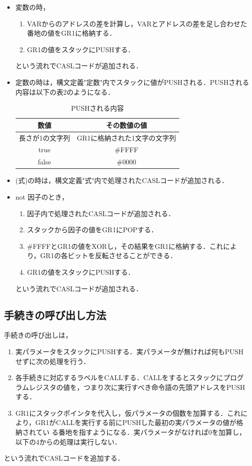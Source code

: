 \documentclass[dvipdfmx]{jarticle}
\begin{document}
  \begin{itemize}
    \item 変数の時，
    \begin{enumerate}
      \item VARからのアドレスの差を計算し，VARとアドレスの差を足し合わせた番地の値をGR1に格納する．
      \item GR1の値をスタックにPUSHする．
    \end{enumerate}
    という流れでCASLコードが追加される．
    \item 定数の時は，構文定義"定数"内でスタックに値がPUSHされる．PUSHされる内容は以下の表2のようになる．
    \begin{table}[h]
      \centering
      \begin{tabular}{|c||c|}
        \hline
        数値 & その数値の値\\\hline
        長さが1の文字列 & GR1に格納された1文字の文字列\\\hline
        true & \#FFFF\\\hline
        false & \#0000\\\hline
      \end{tabular}
      \caption{PUSHされる内容}
    \end{table}
    \item  (式)の時は，構文定義"式"内で処理されたCASLコードが追加される．
    \item not 因子のとき，
    \begin{enumerate}
      \item 因子内で処理されたCASLコードが追加される．
      \item スタックから因子の値をGR1にPOPする．
      \item \#FFFFとGR1の値をXORし，その結果をGR1に格納する．これにより，GR1の各ビットを反転させることができる．
      \item GR1の値をスタックにPUSHする．
    \end{enumerate}
    という流れでCASLコードが追加される．
  \end{itemize}
\subsection{手続きの呼び出し方法}
手続きの呼び出しは，
\begin{enumerate}
  \item 実パラメータをスタックにPUSHする．実パラメータが無ければ何もPUSHせずに次の処理を行う．
  \item 各手続きに対応するラベルをCALLする．CALLをするとスタックにプログラムレジスタの値を，つまり次に実行すべき命令語の先頭アドレスをPUSHする．
  \item GR1にスタックポインタを代入し，仮パラメータの個数を加算する．これにより，GR1がCALLを実行する前にPUSHした最初の実パラメータの値が格納されてい
  る番地を指すようになる．実パラメータがなければ0を加算し，以下の4からの処理は実行しない．
\end{enumerate}
という流れでCASLコードを追加する．
\end{document}
